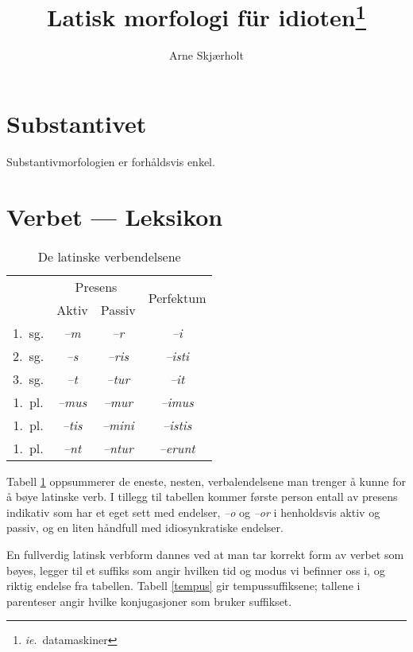 \documentclass[a4paper]{article}
\title{Latisk morfologi f\"ur idioten\footnote{\emph{ie}.~datamaskiner}}
\author{Arne Skj\ae{}rholt}
\begin{document}
\maketitle

\section{Substantivet}
Substantivmorfologien er forh\aa{}ldsvis enkel.

\section{Verbet --- Leksikon}

\begin{table}[hp]
\begin{center}
\begin{tabular}{|c|c|c|c|}
    \hline
       & \multicolumn{2}{c|}{Presens} & \multirow{2}{*}{Perfektum} \\ \cline{2-3}
       & Aktiv & Passiv & \\
    \hline
1.~sg. & \emph{--m}   & \emph{--r}    & \emph{--i}       \\
2.~sg. & \emph{--s}   & \emph{--ris}  & \emph{--isti}    \\
3.~sg. & \emph{--t}   & \emph{--tur}  & \emph{--it}      \\
1.~pl. & \emph{--mus} & \emph{--mur}  & \emph{--imus}    \\
1.~pl. & \emph{--tis} & \emph{--mini} & \emph{--istis}   \\
1.~pl. & \emph{--nt}  & \emph{--ntur} & \emph{--erunt}   \\
    \hline
\end{tabular}
\caption{De latinske verbendelsene}
\label{endelser}
\end{center}
\end{table}

Tabell \ref{endelser} oppsummerer de eneste, nesten, verbalendelsene man
trenger \aa{} kunne for \aa{} b\o{}ye latinske verb. I tillegg til tabellen
kommer f\o{}rste person entall av presens indikativ som har et eget sett med
endelser, \emph{--o} og \emph{--or} i henholdsvis aktiv og passiv, og en liten
h\aa{}ndfull med idiosynkratiske endelser.

En fullverdig latinsk verbform dannes ved at man tar korrekt form av verbet
som b\o{}yes, legger til et suffiks som angir hvilken tid og modus vi befinner
oss i, og riktig endelse fra tabellen. Tabell \ref{tempus} gir
tempussuffiksene; tallene i parenteser angir hvilke konjugasjoner som bruker
suffikset.
\end{document}
